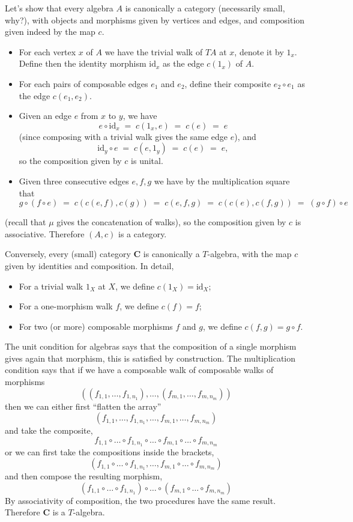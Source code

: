 \documentclass[12pt,oneside,headings=small]{scrbook}
\numberwithin{equation}{section}
\theoremstyle{plain}
\theoremstyle{definition}
\newcommand{\cat}[1]{{\mathbf{#1}}} %
\DeclareMathOperator{\1}{\mathbbm{1}}
\DeclareMathOperator{\2}{\mathbbm{2}}
\newcommand{\id}{\mathrm{id}} %
\begin{document}
 Let's show that every algebra $A$ is canonically a category (necessarily small, why?), with objects and morphisms given by vertices and edges, and composition given indeed by the map $c$. 
 \begin{itemize}
  \item For each vertex $x$ of $A$ we have the trivial walk of $TA$ at $x$, denote it by $1_x$. Define then the identity morphism $\id_x$ as the edge $c(1_x)$ of $A$. 
  \item For each pairs of composable edges $e_1$ and $e_2$, define their composite $e_2\circ e_1$ as the edge $c(e_1,e_2)$. 
  \item Given an edge $e$ from $x$ to $y$, we have
  $$
  e \circ \id_x \;=\; c(1_x,e) \;=\; c(e) \;=\;e
  $$
  (since composing with a trivial walk gives the same edge $e$), and 
  $$
  \id_y\circ e \;=\; c(e,1_y) \;=\; c(e) \;=\; e ,
  $$
  so the composition given by $c$ is unital.
  \item Given three consecutive edges $e,f,g$ we have by the multiplication square that
  $$
  g\circ (f\circ e) \;=\; c(c(e,f),c(g)) \;=\; c(e,f,g) \;=\; c(c(e),c(f,g)) \;=\; (g\circ f)\circ e 
  $$
 \end{itemize}
 (recall that $\mu$ gives the concatenation of walks),
 so the composition given by $c$ is associative.
 Therefore $(A,c)$ is a category.

 Conversely, every (small) category $\cat{C}$ is canonically a $T$-algebra, with the map $c$ given by identities and composition. In detail,
 \begin{itemize}
  \item For a trivial walk $1_X$ at $X$, we define $c(1_X)=\id_X$;
  \item For a one-morphism walk $f$, we define $c(f)=f$;
  \item For two (or more) composable morphisms $f$ and $g$, we define $c(f,g)=g\circ f$. 
 \end{itemize}
 The unit condition for algebras says that the composition of a single morphism gives again that morphism, this is satisfied by construction. The multiplication condition says that if we have a composable walk of composable walks of morphisms 
 $$
 ((f_{1,1},\dots,f_{1,n_1}),\dots,(f_{m,1},\dots,f_{m,n_m}))
 $$
 then we can either first ``flatten the array'' 
 $$
 (f_{1,1},\dots,f_{1,n_1},\dots,f_{m,1},\dots,f_{m,n_m})
 $$
 and take the composite,
 $$
 f_{1,1}\circ\dots\circ f_{1,n_1}\circ\dots\circ f_{m,1}\circ\dots\circ f_{m,n_m}
 $$
 or we can first take the compositions inside the brackets,
 $$
 (f_{1,1}\circ\dots\circ f_{1,n_1},\dots,f_{m,1}\circ\dots\circ f_{m,n_m})
 $$
 and then compose the resulting morphism,
 $$
 (f_{1,1}\circ\dots\circ f_{1,n_1})\circ\dots\circ (f_{m,1}\circ\dots\circ f_{m,n_m})
 $$
 By associativity of composition, the two procedures have the same result. Therefore $\cat{C}$ is a $T$-algebra.
 
\end{document}
